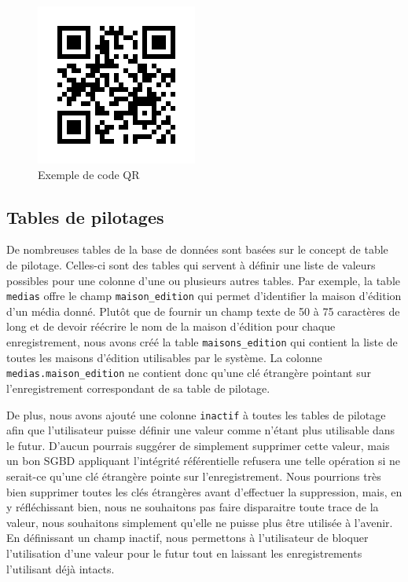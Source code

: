 \documentclass[letter, 11pt]{report}
\begin{document}
\begin{figure}[htbp]
	\begin{center}
		\includegraphics[scale=0.5]{qr.png}
	\end{center}
	\caption{Exemple de code QR}
\end{figure}

\subsection{Tables de pilotages}
\label{sec:tables_de_pilotage}
De nombreuses tables de la base de données sont basées sur le concept de table de pilotage. Celles-ci sont des tables qui servent à définir une liste de valeurs possibles pour une colonne d'une ou plusieurs autres tables. Par exemple, la table \texttt{medias} offre le champ \texttt{maison\_edition} qui permet d'identifier la maison d'édition d'un média donné. Plutôt que de fournir un champ texte de 50 à 75 caractères de long et de devoir réécrire le nom de la maison d'édition pour chaque enregistrement, nous avons créé la table \texttt{maisons\_edition} qui contient la liste de toutes les maisons d'édition utilisables par le système. La colonne \texttt{medias.maison\_edition} ne contient donc qu'une clé étrangère pointant sur l'enregistrement correspondant de sa table de pilotage.

De plus, nous avons ajouté une colonne \texttt{inactif} à toutes les tables de pilotage afin que l'utilisateur puisse définir une valeur comme n'étant plus utilisable dans le futur. D'aucun pourrais suggérer de simplement supprimer cette valeur, mais un bon \ac{SGBD} appliquant l'intégrité référentielle refusera une telle opération si ne serait-ce qu'une clé étrangère pointe sur l'enregistrement. Nous pourrions très bien supprimer toutes les clés étrangères avant d'effectuer la suppression, mais, en y réfléchissant bien, nous ne souhaitons pas faire disparaitre toute trace de la valeur, nous souhaitons simplement qu'elle ne puisse plus être utilisée à l'avenir. En définissant un champ inactif, nous permettons à l'utilisateur de bloquer l'utilisation d'une valeur pour le futur tout en laissant les enregistrements l'utilisant déjà intacts.
\end{document}
